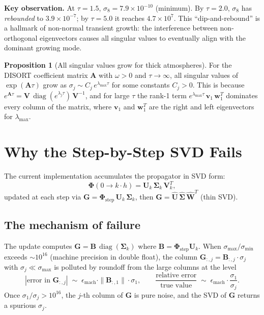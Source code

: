 \documentclass[11pt,a4paper]{article}
\newcommand{\diag}{\operatorname{diag}}
\newcommand{\vect}[1]{\bm{#1}}
\newcommand{\mat}[1]{\mathbf{#1}}
\theoremstyle{definition}
\newtheorem{proposition}{Proposition}
\begin{document}
\textbf{Key observation.}  At $\tau=1.5$, $\sigma_8=7.9\times 10^{-10}$
(minimum).  By $\tau=2.0$, $\sigma_8$ has \emph{rebounded} to
$3.9\times 10^{-7}$; by $\tau=5.0$ it reaches $4.7\times 10^{7}$.  This
``dip-and-rebound'' is a hallmark of non-normal transient growth: the
interference between non-orthogonal eigenvectors causes all singular values
to eventually align with the dominant growing mode.

\begin{proposition}[All singular values grow for thick atmospheres]
For the DISORT coefficient matrix $\mat{A}$ with $\omega>0$ and
$\tau\to\infty$, all singular values of $\exp(\mat{A}\tau)$ grow as
$\sigma_j \sim C_j\,e^{\lambda_{\max}\tau}$ for some constants $C_j>0$.
This is because $e^{\mat{A}\tau} = \mat{V}\,\diag(e^{\lambda_j\tau})\,\mat{V}^{-1}$,
and for large $\tau$ the rank-1 term
$e^{\lambda_{\max}\tau}\,\vect{v}_1\,\vect{w}_1^T$ dominates every
column of the matrix, where $\vect{v}_1$ and $\vect{w}_1^T$ are the
right and left eigenvectors for $\lambda_{\max}$.
\end{proposition}


\section{Why the Step-by-Step SVD Fails}\label{sec:svd_failure}

The current implementation accumulates the propagator in SVD form:
\[
  \mat{\Phi}(0\to k\cdot h) = \mat{U}_k\,\mat{\Sigma}_k\,\mat{V}_k^T,
\]
updated at each step via
$\mat{G} = \mat{\Phi}_{\text{step}}\,\mat{U}_k\,\mat{\Sigma}_k$,
then $\mat{G}=\hat{\mat{U}}\,\hat{\mat{\Sigma}}\,\hat{\mat{W}}^T$ (thin SVD).

\subsection{The mechanism of failure}
The update computes $\mat{G}=\mat{B}\,\diag(\mat{\Sigma}_k)$ where
$\mat{B}=\mat{\Phi}_{\text{step}}\mat{U}_k$.  When $\sigma_{\max}/\sigma_{\min}$
exceeds $\sim 10^{16}$ (machine precision in double float), the column
$\mat{G}_{:,j}=\mat{B}_{:,j}\cdot\sigma_j$ with $\sigma_j\ll\sigma_{\max}$
is polluted by roundoff from the large columns at the level
\[
  |\text{error in }\mat{G}_{:,j}| \;\sim\; \epsilon_{\text{mach}}\cdot
  \|\mat{B}_{:,1}\|\cdot\sigma_1,
  \qquad
  \frac{\text{relative error}}{\text{true value}} \;\sim\;
  \epsilon_{\text{mach}}\cdot\frac{\sigma_1}{\sigma_j}.
\]
Once $\sigma_1/\sigma_j > 10^{16}$, the $j$-th column of $\mat{G}$ is pure
noise, and the SVD of $\mat{G}$ returns a spurious $\sigma_j$.
\end{document}
